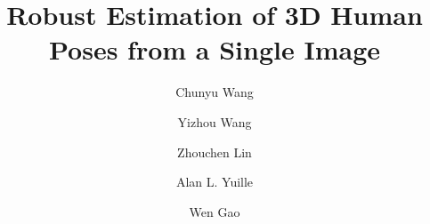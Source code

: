\documentclass[10pt,twocolumn,letterpaper]{article}
\begin{document}
\def\memonumber{ \textsf{013}} \def\memodate{\textsf{\today}} \def\memotitle{\textsf{Robust Estimation of 3D Human Poses from a Single Image}} \def\memoauthors{\textsf{Chunyu Wang,Yizhou Wang,Zhouchen Lin,Alan L. Yuille,Wen Gao}\\
Peking University, Beijing, China~~
University of California, Los Angeles\\
{\tt\small \{wangchunyu,yizhou.wang, zlin\}@pku.edu.cn~@yuille@stat.ucla.edu~wgao@pku.edu.cn}}

\def\memoabstract{\textsf{Human pose estimation is a key step to action recognition. We propose a method of estimating 3D human poses from a single image, which works in conjunction with an existing 2D pose/joint detector. 3D pose estimation is challenging because multiple 3D poses may correspond to the same 2D pose after projection due to the lack of depth information. Moreover, current 2D pose estimators are usually inaccurate which may cause errors in the 3D estimation. We address the challenges in three ways: (i) We represent a 3D pose as a linear combination of a sparse set of bases learned from 3D human skeletons. (ii) We enforce limb length constraints to eliminate anthropomorphically implausible skeletons. (iii) We estimate a 3D pose by minimizing the -norm error between the projection of the 3D pose and the corresponding 2D detection. The -norm loss term is robust to inaccurate 2D joint estimations. We use the alternating direction method (ADM) to solve the optimization problem efficiently. Our approach outperforms the state-of-the-arts on three benchmark datasets.}}

\titleAT 

\newpage
\twocolumn

\title{Robust Estimation of 3D Human Poses from a Single Image}

\author[1,2]{Chunyu Wang}
\author[1,2]{Yizhou Wang}
\author[2]{Zhouchen Lin}
\author[3]{Alan L. Yuille}
\author[1]{Wen Gao}

\maketitle
\end{document}
